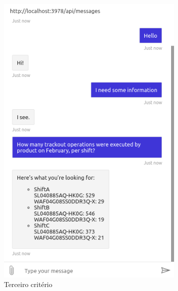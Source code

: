 \begin{figure}
\begin{subfigure}[t]{.48\textwidth}
        \includegraphics[width=.85\textwidth]{ch06/assets/response03.png}
        \caption{Terceiro critério}
     \end{subfigure}
         \begin{subfigure}[t]{.48\textwidth}
        \centering

\end{subfigure}
\end{figure}
